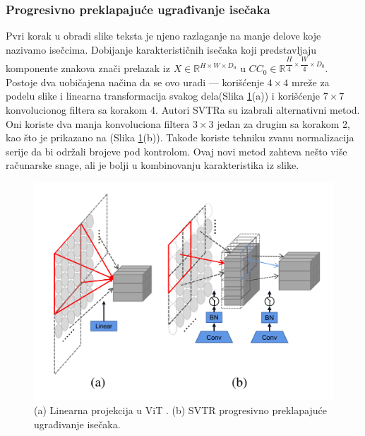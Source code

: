 \documentclass[a4paper,12pt]{article}
\begin{document}
	\subsubsection{Progresivno preklapajuće ugrađivanje isečaka}
	
	Pvri korak u obradi slike teksta je njeno razlaganje na manje delove koje nazivamo isečcima. Dobijanje karakterističnih isečaka koji predstavljaju komponente znakova znači prelazak iz \(X \in \mathbb{R}^{H \times W \times D_0}\) u \(CC_0 \in \mathbb{R}^{\dfrac{H}{4} \times \dfrac{W}{4} \times D_0}\). Postoje dva uobičajena načina da se ovo uradi — korišćenje \(4 \times 4\) mreže za podelu slike i linearna transformacija svakog dela(Slika \ref{fig:linear-projection-in-ViT}(a)) i korišćenje \(7 \times 7\) konvolucionog filtera sa korakom 4. Autori SVTRa su izabrali alternativni metod. Oni koriste dva manja konvoluciona filtera \(3 \times 3\) jedan za drugim sa korakom 2, kao što je prikazano na (Slika \ref{fig:linear-projection-in-ViT}(b)). Takođe koriste tehniku zvanu normalizacija serije da bi održali brojeve pod kontrolom. Ovaj novi metod zahteva nešto više računarske snage, ali je bolji u kombinovanju karakteristika iz slike.

	\begin{figure}[H]
		\centering
		\includegraphics[width=\textwidth]{assets/linear-projection-in-ViT.png}
		\caption{(a) Linearna projekcija u ViT \cite{dosovitskiy2021imageworth16x16words}. (b) SVTR progresivno preklapajuće ugrađivanje isečaka.}
		\label{fig:linear-projection-in-ViT}
	\end{figure}
	
\end{document}

